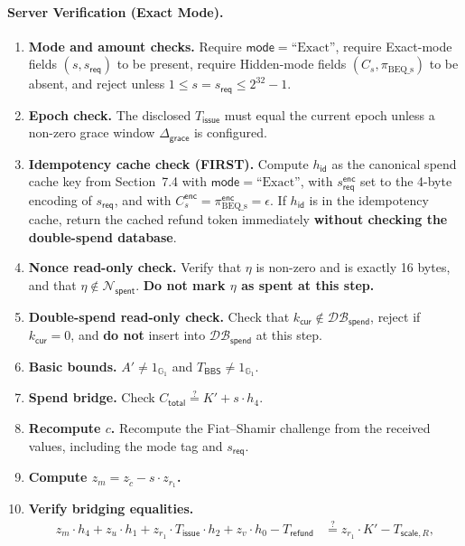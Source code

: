 \documentclass[11pt]{article}
\theoremstyle{definitionstyle}
\theoremstyle{plain}
\newcommand{\DB}{\mathcal{DB}}
\begin{document}
\paragraph{Server Verification (Exact Mode).}
\begin{enumerate}[leftmargin=*]
\item \textbf{Mode and amount checks.} Require $\mathsf{mode} = \text{``Exact''}$, require Exact-mode fields $(s, s_{\mathsf{req}})$ to be present, require Hidden-mode fields $(C_s, \pi_{\text{BEQ\_s}})$ to be absent, and reject unless $1 \le s = s_{\mathsf{req}} \le 2^{32}-1$.
\item \textbf{Epoch check.} The disclosed $T_{\mathsf{issue}}$ must equal the current epoch unless a non-zero grace window $\Delta_{\mathsf{grace}}$ is configured.
\item \textbf{Idempotency cache check (FIRST).} Compute $h_{\mathsf{id}}$ as
  the canonical spend cache key from Section~7.4 with
  $\mathsf{mode}=\text{``Exact''}$, with $s_{\mathsf{req}}^{\mathsf{enc}}$ set
  to the 4-byte encoding of $s_{\mathsf{req}}$, and with
  $C_s^{\mathsf{enc}} = \pi_{\text{BEQ\_s}}^{\mathsf{enc}} = \epsilon$.
  If $h_{\mathsf{id}}$ is in the idempotency cache, return the cached refund token immediately \textbf{without checking the double-spend database}.
\item \textbf{Nonce read-only check.} Verify that $\eta$ is non-zero and is exactly 16 bytes, and that $\eta \notin \mathcal{N}_{\mathsf{spent}}$. \textbf{Do not mark $\eta$ as spent at this step.}
\item \textbf{Double-spend read-only check.} Check that $k_{\mathsf{cur}} \notin \DB_{\mathsf{spend}}$, reject if $k_{\mathsf{cur}} = 0$, and \textbf{do not} insert into $\DB_{\mathsf{spend}}$ at this step.
\item \textbf{Basic bounds.} $A' \neq 1_{\mathbb{G}_1}$ and $T_{\mathsf{BBS}} \neq 1_{\mathbb{G}_1}$.
\item \textbf{Spend bridge.} Check $C_{\mathsf{total}} \stackrel{?}{=} K' + s \cdot h_4$.
\item \textbf{Recompute $c$.} Recompute the Fiat--Shamir challenge from the received values, including the mode tag and $s_{\mathsf{req}}$.
\item \textbf{Compute $z_m = z_{\tilde{c}} - s \cdot z_{r_1}$.}
\item \textbf{Verify bridging equalities.}
  \begin{align*}
    z_m \cdot h_4 + z_u \cdot h_1 + z_{r_1} \cdot T_{\mathsf{issue}} \cdot h_2 + z_v \cdot h_0 - T_{\mathsf{refund}} &\stackrel{?}{=} z_{r_1} \cdot K' - T_{\mathsf{scale},R}, \\

\end{align*}
\end{enumerate}
\end{document}
